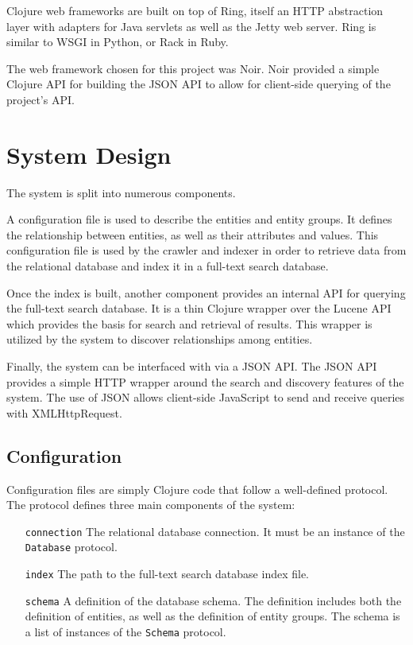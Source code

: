 \documentclass[12pt,letterpaper,oneside,notitlepage]{report}
\theoremstyle{definition}
\begin{document}
        Clojure web frameworks are built on top of Ring, itself an HTTP abstraction layer with adapters for Java servlets as well as the Jetty web server.  Ring is similar to WSGI in Python, or Rack in Ruby.
        
        The web framework chosen for this project was Noir.  Noir provided a simple Clojure API for building the JSON API to allow for client-side querying of the project's API.
      
    \section{System Design}
      The system is split into numerous components.
      
      A configuration file is used to describe the entities and entity groups.  It defines the relationship between entities, as well as their attributes and values.  This configuration file is used by the crawler and indexer in order to retrieve data from the relational database and index it in a full-text search database.
      
      Once the index is built, another component provides an internal API for querying the full-text search database.  It is a thin Clojure wrapper over the Lucene API which provides the basis for search and retrieval of results.  This wrapper is utilized by the system to discover relationships among entities.
      
      Finally, the system can be interfaced with via a JSON API.  The JSON API provides a simple HTTP wrapper around the search and discovery features of the system.  The use of JSON allows client-side JavaScript to send and receive queries with XMLHttpRequest.
      
      
      \subsection{Configuration}
        Configuration files are simply Clojure code that follow a well-defined protocol.  The protocol defines three main components of the system:
        
        \begin{itemize}
          \item[\texttt{connection}] The relational database connection.  It must be an instance of the \texttt{Database} protocol.
          \item[\texttt{index}] The path to the full-text search database index file.
          \item[\texttt{schema}] A definition of the database schema.  The definition includes both the definition of entities, as well as the definition of entity groups.  The schema is a list of instances of the \texttt{Schema} protocol.
        \end{itemize}
        
\end{document}
